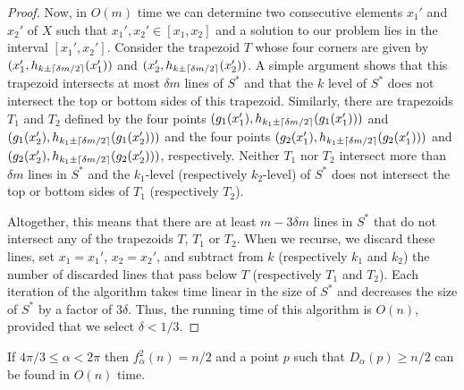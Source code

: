 \documentclass[lotsofwhite]{patmorin}
\begin{document}
\begin{proof}
Now, in $O(m)$ time we can determine two consecutive elements $x_1'$
and $x_2'$ of $X$ such that $x_1',x_2'\in[x_1,x_2]$ and a solution to our
problem lies in the interval $[x_1',x_2']$.  Consider the trapezoid
$T$ whose four corners are given by $(x_1',h_{k\pm\left\lceil \delta
m/2 \right\rceil}(x_1'))$ and $(x_2',h_{k\pm\left\lceil \delta m/2 \right\rceil}(x_2'))$.  A simple
argument \cite[Lemma~X]{lms94} shows that this trapezoid intersects at
most $\delta m$ lines of $S^*$ and that the $k$ level of $S^*$ does
not intersect the top or bottom sides of this trapezoid.  Similarly,
there are trapezoids $T_1$ and $T_2$ defined by the four points 
$(g_1(x_1'),h_{k_1\pm\left\lceil \delta m/2 \right\rceil}(g_1(x_1')))$ and
$(g_1(x_2'),h_{k_1\pm\left\lceil \delta m/2 \right\rceil}(g_1(x_2')))$ and the four
points
$(g_2(x_1'),h_{k_1\pm\left\lceil \delta m/2 \right\rceil}(g_2(x_1')))$ and
$(g_2(x_2'),h_{k_1\pm\left\lceil \delta m/2 \right\rceil}(g_2(x_2')))$, respectively.
Neither $T_1$ nor $T_2$ intersect more than $\delta m$ lines in $S^*$
and the $k_1$-level (respectively $k_2$-level) of $S^*$ does not
intersect the top or bottom sides of $T_1$ (respectively $T_2$).

Altogether, this means that there are at least $m-3\delta m$ lines in
$S^*$ that do not intersect any of the trapezoids $T$, $T_1$ or $T_2$.
When we recurse, we discard these lines, set $x_1=x_1'$, $x_2=x_2'$,
and subtract from $k$ (respectively $k_1$ and $k_2$) the number of
discarded lines that pass below $T$ (respectively $T_1$ and $T_2$).
Each iteration of the algorithm takes time linear in the size of $S^*$
and decreases the size of $S^*$ by a factor of $3\delta$.  Thus, the
running time of this algorithm is $O(n)$, provided that we select
$\delta < 1/3$.
\end{proof}

\begin{lem}
If $4\pi/3\le \alpha < 2\pi$ then $f^2_\alpha(n) = n/2$ and a point
$p$ such that $D_\alpha(p)\ge n/2$ can be found in $O(n)$ time.
\end{lem}
\end{document}
